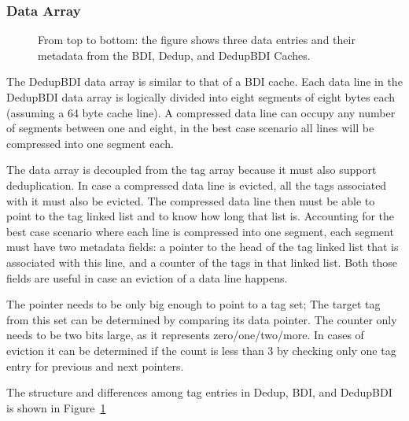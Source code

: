 \subsubsection{Data Array}
\label{sssec:DedupBDIData}
\begin{figure}
    \caption[DedupBDI Data Array]{From top to bottom: the figure shows three data entries and their metadata from the BDI, Dedup, and DedupBDI Caches.}
    \label{fig:DedupBDI_Data}
\end{figure}
The DedupBDI data array is similar to that of a BDI cache. Each data line in the DedupBDI data array is logically divided into eight segments of eight bytes each (assuming a 64 byte cache line). A compressed data line can occupy any number of segments between one and eight, in the best case scenario all lines will be compressed into one segment each.\par
The data array is decoupled from the tag array because it must also support deduplication. In case a compressed data line is evicted, all the tags associated with it must also be evicted. The compressed data line then must be able to point to the tag linked list and to know how long that list is. Accounting for the best case scenario where each line is compressed into one segment, each segment must have two metadata fields: a pointer to the head of the tag linked list that is associated with this line, and a counter of the tags in that linked list. Both those fields are useful in case an eviction of a data line happens.\par
The pointer needs to be only big enough to point to a tag set; The target tag from this set can be determined by comparing its data pointer. The counter only needs to be two bits large, as it represents zero/one/two/more. In cases of eviction it can be determined if the count is less than 3 by checking only one tag entry for previous and next pointers.\par
The structure and differences among tag entries in Dedup, BDI, and DedupBDI is shown in Figure~\ref{fig:DedupBDI_Data}
